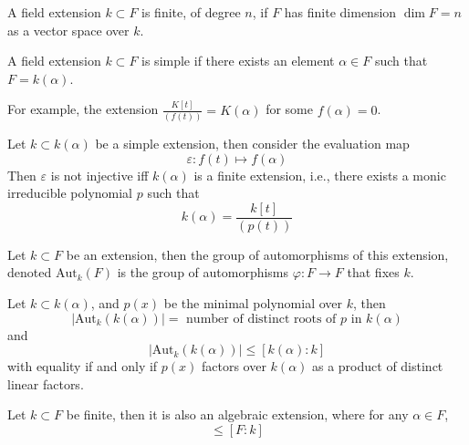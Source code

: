 \documentclass[openany]{book}
\begin{document}
\begin{defn}
    A field extension $k\subset F$ is finite, of degree $n$, if $F$ has finite dimension $\dim F=n$ as a vector space over $k$.
\end{defn}


\begin{defn}
    A field extension $k\subset F$ is simple if there exists an element $\alpha\in F$ such that $F=k(\alpha)$.

    For example, the extension $\frac{K[t]}{(f(t))}=K(\alpha)$ for some $f(\alpha)=0$. 
\end{defn}


\begin{prop}
    Let $k\subset k(\alpha)$ be a simple extension, then consider the evaluation map 
    \begin{equation*}
        \varepsilon: f(t)\mapsto f(\alpha)
    \end{equation*}
    Then $\varepsilon$ is not injective iff $k(\alpha)$ is a finite extension, i.e., there exists a monic irreducible polynomial $p$ such that 
    \begin{equation*}
        k(\alpha)=\frac{k[t]}{(p(t))}
    \end{equation*}
\end{prop}

\begin{defn}
    Let $k\subset F$ be an extension, then the group of automorphisms of this extension, denoted $\text{Aut}_k(F)$ is the group of automorphisms $\varphi:F\to F$ that fixes $k$.
\end{defn}

\begin{cor}
    Let $k\subset k(\alpha)$, and $p(x)$ be the minimal polynomial over $k$, then 
    \begin{equation*}
        |\text{Aut}_k(k(\alpha))|=\text{ number of distinct roots of $p$ in $k(\alpha)$}
    \end{equation*}
    and 
    \begin{equation*}
        |\text{Aut}_k(k(\alpha))|\leq [k(\alpha):k]
    \end{equation*}
    with equality if and only if $p(x)$ factors over $k(\alpha)$ as a product of distinct linear factors.
\end{cor}


\begin{prop}
    Let $k\subset F$ be finite, then it is also an algebraic extension, where for any $\alpha\in F$, 
    \begin{equation*}
        [k(\alpha):k]\leq [F: k]
    \end{equation*}
\end{prop}
\end{document}
